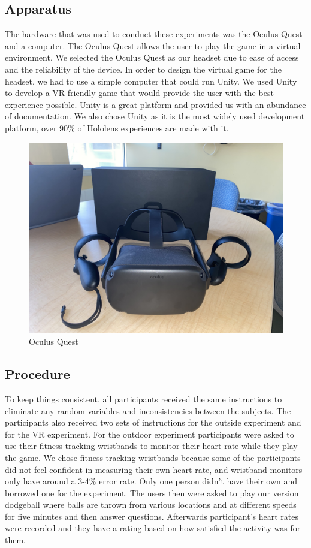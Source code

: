 \documentclass{sigchi}
\begin{document}
\subsection{Apparatus}
The hardware that was used to conduct these experiments was the Oculus Quest and a computer. The Oculus Quest allows the user to play the game in a virtual environment. We selected the Oculus Quest as our headset due to ease of access and the reliability of the device. In order to design the virtual game for the headset, we had to use a simple computer that could run Unity. We used Unity to develop a VR friendly game that would provide the user with the best experience possible. Unity is a great platform and provided us with an abundance of documentation. We also chose Unity as it is the most widely used development platform, over 90\% of Hololens experiences are made with it\cite{unity}.
\begin{figure}
    \centering
    \includegraphics[scale=0.05]{figures/Oculus.jpg}
    \caption{Oculus Quest}
    \label{fig:my_label0}
\end{figure}

\subsection{Procedure}
To keep things consistent, all participants received the same instructions to eliminate any random variables and inconsistencies between the subjects. The participants also received two sets of instructions for the outside experiment and for the VR experiment. For the outdoor experiment participants were asked to use their fitness tracking wristbands to monitor their heart rate while they play the game. We chose fitness tracking wristbands because some of the participants did not feel confident in measuring their own heart rate, and wristband monitors only have around a 3-4\% error rate\cite{sarah_dinkel_john_m_noble_2016}. Only one person didn't have their own and borrowed one for the experiment. The users then were asked to play our version dodgeball where balls are thrown from various locations and at different speeds for five minutes and then answer questions. Afterwards participant’s heart rates were recorded and they have a rating based on how satisfied the activity was for them.  
\end{document}
